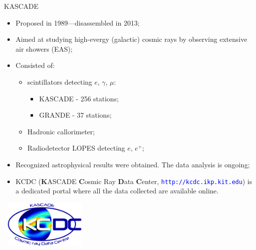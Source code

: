 \begin{frame}{KASCADE}
\begin{itemize}
  \item Proposed in 1989---disassembled in 2013;
  \item Aimed at studying 
  high-evergy (galactic) cosmic rays by observing extensive air showers (EAS);
  \item Consisted of:
  \begin{itemize}
    \item scintillators detecting $e$, $\gamma$, $\mu$:
    \begin{itemize}
    \item KASCADE - 256 stations;
    \item GRANDE - 37 stations;
    \end{itemize}
    \item Hadronic callorimeter;
    \item Radiodetector LOPES detecting $e$, $e^{+}$;
  \end{itemize}
  \item Recognized astrophysical results were obtained. The data analysis is ongoing;
  \item KCDC (\textbf{K}ASCADE \textbf{C}osmic Ray \textbf{D}ata \textbf{C}enter, \textcolor{blue}{\texttt{http://kcdc.ikp.kit.edu}}) is a dedicated portal where all the data collected are available online. %
\end{itemize}

\parbox[t][0pt]{0pt}{
  \vspace{-0.63\textheight}
  ~\hspace{0.68\textwidth}\includegraphics[width=0.3\textwidth]{pics/KCDC-Logo.png}
}
\end{frame}

